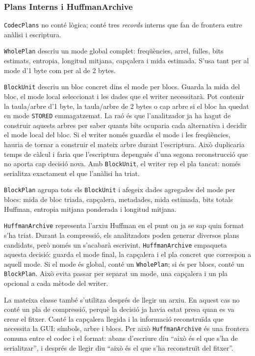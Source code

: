 \documentclass[conference,compsoc]{IEEEtran}
\begin{document}
\subsubsection{Plans Interns i HuffmanArchive}

\texttt{CodecPlans} no conté lògica; conté tres \textit{records} interns que fan
de frontera entre anàlisi i escriptura.

\texttt{WholePlan} descriu un
mode global complet: freqüències, arrel, fulles, bits estimats, entropia,
longitud mitjana, capçalera i mida estimada. S'usa tant per al mode
d'1 byte com per al de 2 bytes.

\texttt{BlockUnit} descriu un bloc concret dins el mode per blocs. Guarda
la mida del bloc, el mode local seleccionat i les dades que el writer
necessitarà. Pot contenir la taula/arbre d'1 byte, la taula/arbre de
2 bytes o cap arbre si el bloc ha quedat en mode \texttt{STORED} emmagatzemat.
La raó és que l'analitzador ja ha hagut de construir aquests arbres per saber quants
bits ocuparia cada alternativa i decidir el mode local del bloc. Si el
writer només guardàs el mode i les freqüències, hauria de tornar a
construir el mateix arbre durant l'escriptura. Això duplicaria temps de
càlcul i faria que l'escriptura depengués d'una segona reconstrucció que
no aporta cap decisió nova. Amb \texttt{BlockUnit}, el writer rep el pla
tancat: només serialitza exactament el que l'anàlisi ha triat.

\texttt{BlockPlan} agrupa tots els \texttt{BlockUnit} i afegeix dades
agregades del mode per blocs: mida de bloc triada, capçalera, metadades,
mida estimada, bits totals Huffman, entropia mitjana ponderada i longitud
mitjana.

\texttt{HuffmanArchive} representa l'arxiu Huffman en el punt on ja se
sap quin format s'ha triat. Durant la compressió, els analitzadors poden
generar diversos plans candidats, però només un s'acabarà escrivint.
\texttt{HuffmanArchive} empaqueta aquesta decisió: guarda el mode final,
la capçalera i el pla concret que correspon a aquell mode. Si el mode és
global, conté un \texttt{WholePlan}; si és per blocs, conté un
\texttt{BlockPlan}. Això evita passar per separat un mode, una capçalera i
un pla opcional a cada mètode del writer.

La mateixa classe també s'utilitza després de llegir un arxiu. En aquest
cas no conté un pla de compressió, perquè la decisió ja havia estat presa
quan es va crear el fitxer. Conté la capçalera llegida i la informació
reconstruïda que necessita la GUI: símbols, arbre i blocs. Per això
\texttt{HuffmanArchive} és una frontera comuna entre el codec i el
format: abans d'escriure diu ``això és el que s'ha de serialitzar'', i
després de llegir diu ``això és el que s'ha reconstruït del fitxer''.
\end{document}
